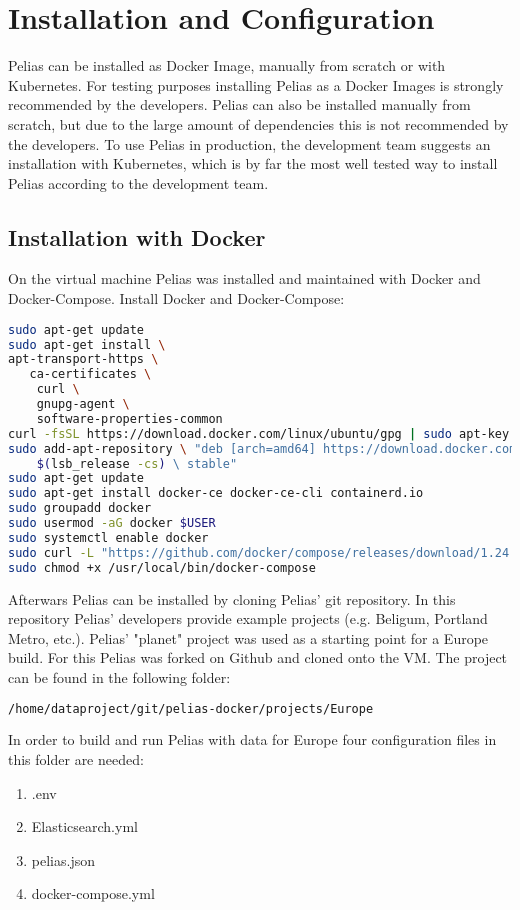 \section{Installation and Configuration}
Pelias can be installed as Docker Image, manually from scratch or with Kubernetes. For testing purposes installing Pelias as a Docker Images is strongly recommended by the developers\cite{Simioni2018b}. Pelias can also be installed manually from scratch, but due to the large amount of dependencies this is not recommended by the developers. To use Pelias in production, the development team suggests an installation with Kubernetes, which is by far the most well tested way to install Pelias according to the development team.

\subsection{Installation with Docker}
On the virtual machine Pelias was installed and maintained with Docker and Docker-Compose. Install Docker and Docker-Compose:
\begin{lstlisting}[language=bash,breaklines=true]
sudo apt-get update
sudo apt-get install \
apt-transport-https \
   ca-certificates \
	curl \
	gnupg-agent \
	software-properties-common
curl -fsSL https://download.docker.com/linux/ubuntu/gpg | sudo apt-key add -
sudo add-apt-repository \ "deb [arch=amd64] https://download.docker.com/linux/ubuntu \
	$(lsb_release -cs) \ stable"
sudo apt-get update
sudo apt-get install docker-ce docker-ce-cli containerd.io
sudo groupadd docker
sudo usermod -aG docker $USER
sudo systemctl enable docker
sudo curl -L "https://github.com/docker/compose/releases/download/1.24.0/docker-compose-$(uname -s)-$(uname -m)" -o /usr/local/bin/docker-compose
sudo chmod +x /usr/local/bin/docker-compose
\end{lstlisting}
Afterwars Pelias can be installed by cloning Pelias' git repository. In this repository Pelias' developers provide example projects (e.g. Beligum, Portland Metro, etc.). Pelias' "planet" project was used as a starting point for a Europe build. For this Pelias was forked on Github and cloned onto the VM. The project can be found in the following folder:
\begin{lstlisting}[language=bash,breaklines=true]
/home/dataproject/git/pelias-docker/projects/Europe
\end{lstlisting}
In order to build and run Pelias with data for Europe four configuration files in this folder are needed:
\begin{enumerate}
\item .env
\item Elasticsearch.yml
\item pelias.json
\item docker-compose.yml
\end{enumerate}
